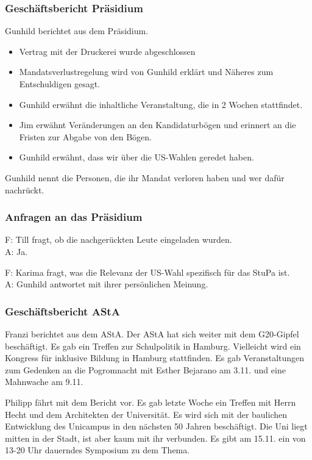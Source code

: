 \documentclass[ngerman,headheight=70pt]{scrartcl}
\begin{document}
    \subsubsection{Geschäftsbericht Präsidium}

    Gunhild berichtet aus dem Präsidium.

    \begin{itemize}
        \item Vertrag mit der Druckerei wurde abgeschlossen
        \item Mandatsverlustregelung wird von Gunhild erklärt und Näheres zum Entschuldigen
      gesagt.
        \item Gunhild erwähnt die inhaltliche Veranstaltung, die in 2 Wochen stattfindet.
        \item Jim erwähnt Veränderungen an den Kandidaturbögen und erinnert an die Fristen
      zur Abgabe von den Bögen.
        \item Gunhild erwähnt, dass wir über die US-Wahlen geredet haben.
    \end{itemize}

    Gunhild nennt die Personen, die ihr Mandat verloren haben und wer dafür nachrückt.

    \subsubsection{Anfragen an das Präsidium}

    F: Till fragt, ob die nachgerückten Leute eingeladen wurden. \\
    A: Ja.

    F: Karima fragt, was die Relevanz der US-Wahl spezifisch für das StuPa
    ist. \\
    A: Gunhild antwortet mit ihrer persönlichen Meinung.

    \subsubsection{Geschäftsbericht AStA}

    Franzi berichtet aus dem AStA. Der AStA hat sich weiter mit dem G20-Gipfel
    beschäftigt. Es gab ein Treffen zur Schulpolitik in Hamburg. Vielleicht wird
    ein Kongress für inklusive Bildung in Hamburg stattfinden. Es gab Veranstaltungen
    zum Gedenken an die Pogromnacht mit Esther Bejarano am 3.11. und eine Mahnwache
    am 9.11.

    Philipp fährt mit dem Bericht vor. Es gab letzte Woche ein Treffen mit Herrn
    Hecht und dem Architekten der Universität. Es wird sich mit der baulichen
    Entwicklung des Unicampus in den nächsten 50 Jahren beschäftigt. Die Uni liegt
    mitten in der Stadt, ist aber kaum mit ihr verbunden. Es gibt am 15.11. ein
    von 13-20 Uhr dauerndes Symposium zu dem Thema.
\end{document}
